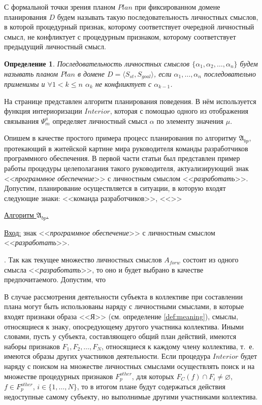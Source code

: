 \documentclass[a4paper, 12pt]{article}
\theoremstyle{plain}
\newtheorem{Def}{Определение}
\begin{document}
	С формальной точки зрения планом $Plan$ при фиксированном домене планирования $D$ будем называть такую последовательность личностных смыслов, в которой процедурный признак, которому соответствует очередной личностный смысл, не конфликтует с процедурным признаком, которому соответствует предыдущий личностный смысл.
	
	\begin{Def}
		Последовательность личностных смыслов $\{\alpha_1,\alpha_2,\dots,\alpha_n\}$ будем называть планом $Plan$ в домене $D=\langle S_{st},S_{goal} \rangle$, если $\alpha_1,\dots,\alpha_n$ последовательно применимы и $\forall 1<k\leqslant n$ $\alpha_k$ не конфликтует с $\alpha_{k-1}$.
	\end{Def}

	На странице \pageref{alg:beh_plan} представлен алгоритм планирования поведения. В нём используется функция интериоризации $Interior$, которая с помощью одного из отображения связывания $\Psi_m^a$ \cite{PanovA2014a} определяет личностный смысл $\alpha$ по элементу значения $\mu$.

	Опишем в качестве простого примера процесс планирования по алгоритму $\mathfrak A_{bp}$, протекающий в житейской картине мира руководителя команды разработчиков программного обеспечения. В первой части статьи был представлен пример работы процедуры целеполагания такого руководителя, актуализирующий знак <<\textit{программное обеспечение}>> с личностным смыслом <<\textit{разработать}>>. Допустим, планирование осуществляется в ситуации, в которую входят следующие знаки: <<команда разработчиков>>, <<>>
	
	\underline{Алгоритм $\mathfrak A_{bp}$.}
	
	\underline{Вход:} знак <<\textit{программное обеспечение}>> с личностным смыслом <<\textit{разработать}>>.

	. Так как текущее множество личностных смыслов $A_{forw}$ состоит из одного смысла <<\textit{разработать}>>, то оно и будет выбрано в качестве предпочитаемого. Допустим, что 
	
	В случае рассмотрения деятельности субъекта в коллективе при составлении плана могут быть использованы наряду с личностными смыслами, в которые входят признаки образа <<Я>> (см. определение \ref{def:meaning}), смыслы, относящиеся к знаку, опосредующему другого участника коллектива. Иными словами, пусть у субъекта, составляющего общий план действий, имеются наборы признаков $F_1,F_2,\dots,F_N$, относящиеся к каждому члену коллектива, т.~е. имеются образы других участников деятельности. Если процедура $Interior$ будет наряду с поиском на множестве личностных смыслами осуществлять поиск и на множестве процедурных признаков $F_p^{other}$, для которых $F_C(f)\cap F_i\not = \varnothing$, $f\in F_p^{other}$, $i\in\{1,\dots,N\}$, то в итогом плане будут содержаться действия недоступные самому субъекту, но выполнимые другими участниками коллектива.
	
\end{document}
